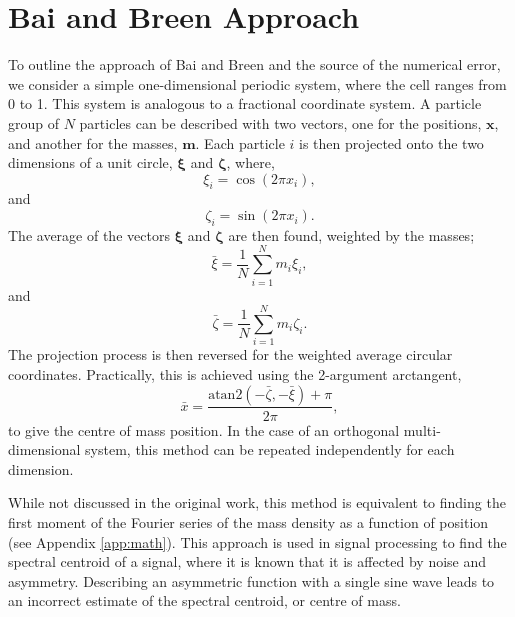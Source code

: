 \documentclass[reprint,superscriptaddress,nobibnotes,amsmath,amssymb,aip]{revtex4-2}
\begin{document}
\section{Bai and Breen Approach}

To outline the approach of Bai and Breen and the source of the numerical error, we consider a simple one-dimensional periodic system, where the cell ranges from \num{0} to \num{1}. 
This system is analogous to a fractional coordinate system. 
A particle group of $N$ particles can be described with two vectors, one for the positions, $\bm{x}$, and another for the masses, $\bm{m}$. 
Each particle $i$ is then projected onto the two dimensions of a unit circle, $\bm{\xi}$ and $\bm{\zeta}$, where, 
%
\begin{equation}
    \xi_i = \cos(2\pi x_i),
\end{equation}
%
and 
%
\begin{equation}
    \zeta_i = \sin(2\pi x_i).
\end{equation}
% 
The average of the vectors $\bm{\xi}$ and $\bm{\zeta}$ are then found, weighted by the masses;
%
\begin{equation}
    \bar{\xi} = \frac{1}{N}\sum_{i=1}^{N}m_i\xi_i,
\end{equation}
% 
and
%
\begin{equation}
    \bar{\zeta} = \frac{1}{N}\sum_{i=1}^{N}m_i\zeta_i.
\end{equation}
% 
The projection process is then reversed for the weighted average circular coordinates.
Practically, this is achieved using the 2-argument arctangent, 
%
\begin{equation}
    \bar{x} = \frac{\text{atan}2(-\bar{\zeta}, -\bar{\xi}) + \pi}{2\pi},
\end{equation}
%
to give the centre of mass position.
In the case of an orthogonal multi-dimensional system, this method can be repeated independently for each dimension. 

While not discussed in the original work, this method is equivalent to finding the first moment of the Fourier series of the mass density as a function of position (see Appendix \ref{app:math}). 
This approach is used in signal processing to find the spectral centroid of a signal,\cite{tzanetakis_musical_2002} where it is known that it is affected by noise and asymmetry.\cite{teague_robust_2018}
Describing an asymmetric function with a single sine wave leads to an incorrect estimate of the spectral centroid, or centre of mass. 
\end{document}
